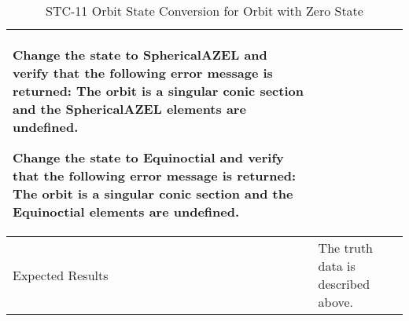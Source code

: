 \begin{table}[htbp!]
\begin{tabular}{|p{1.05 in} |p{4.75 in} |}
\begin{compactenum}
             \item Change the state to SphericalAZEL and verify that the following error message is returned: The orbit is a singular conic section and the SphericalAZEL elements are undefined.
             \item Change the state to Equinoctial and verify that the following error message is returned:
                   The orbit is a singular conic section and the Equinoctial elements are undefined.
         \end{compactenum}
         \\ \hline
         Expected Results & The truth data is described above.\\
      \hline
      \end{tabular}
      \label{Table:STC-11}
      \caption{STC-11 Orbit State Conversion for Orbit with Zero State}
\end{table} 